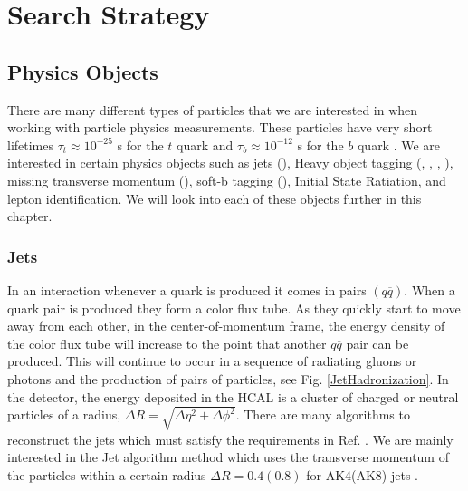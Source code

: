 \chapter{Search Strategy}
\label{ch:SearchStrategy}

\section{Physics Objects}\label{PhysObj}
There are many different types of particles that we are interested in when working with particle physics measurements. These particles have very short lifetimes $\tau_t\approx10^{-25}$ s for the $t$ quark \cite{quadt_top_2007} and $\tau_b\approx10^{-12}$ s for the $b$ quark \cite{lenz_lifetimes_2019}. We are interested in certain physics objects such as jets (\nj), Heavy object tagging (\nb, \nt, \nrt, \nw), missing transverse momentum (\met), soft-b tagging (\nsv), Initial State Ratiation, and lepton identification. We will look into each of these objects further in this chapter.


\subsection{Jets}\label{Jets}
In an interaction whenever a quark is produced it comes in pairs $(q\overline{q})$. When a quark pair is produced they form a color flux tube. As they quickly start to move away from each other, in the center-of-momentum frame, the energy density of the color flux tube will increase to the point that another $q\overline{q}$ pair can be produced. This will continue to occur in a sequence of radiating gluons or photons and the production of pairs of particles, see Fig. \ref{JetHadronization}. 
In the detector, the energy deposited in the HCAL is a cluster of charged or neutral particles of a radius, $\Delta R=\sqrt{\Delta\eta^2+\Delta\phi^2}$. There are many algorithms to reconstruct the jets which must satisfy the requirements in Ref. \cite{noauthor_jet_2010}. We are mainly interested in the \antikt{} Jet algorithm \cite{cacciari_anti-ktjet_2008} method which uses the transverse momentum of the particles within a certain radius $\Delta R = 0.4 (0.8)$ for AK4(AK8) jets \cite{noauthor_https://twiki.cern.ch/twiki/bin/view/cms/jetid_nodate, noauthor_https://twiki.cern.ch/twiki/bin/view/cms/introtojec_nodate}. 

